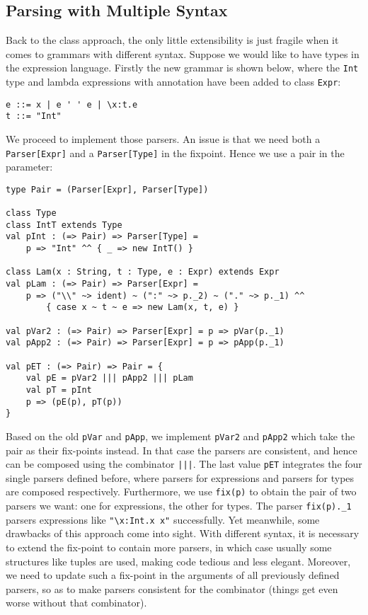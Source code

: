 \subsection{Parsing with Multiple Syntax}\label{subsec:differentsyntax}


Back to the class approach, the only little extensibility is just fragile when it comes to grammars with different syntax. Suppose we would like to have types in the expression language. Firstly the new grammar is shown below, where the \lstinline{Int} type and lambda expressions with annotation have been added to class \lstinline{Expr}:
\begin{lstlisting}
e ::= x | e ' ' e | \x:t.e
t ::= "Int"
\end{lstlisting}

We proceed to implement those parsers. An issue is that we need both a \lstinline{Parser[Expr]} and a \lstinline{Parser[Type]} in the fixpoint.
Hence we use a pair in the parameter:
\begin{lstlisting}
type Pair = (Parser[Expr], Parser[Type])

class Type
class IntT extends Type
val pInt : (=> Pair) => Parser[Type] =
    p => "Int" ^^ { _ => new IntT() }

class Lam(x : String, t : Type, e : Expr) extends Expr
val pLam : (=> Pair) => Parser[Expr] =
    p => ("\\" ~> ident) ~ (":" ~> p._2) ~ ("." ~> p._1) ^^
        { case x ~ t ~ e => new Lam(x, t, e) }

val pVar2 : (=> Pair) => Parser[Expr] = p => pVar(p._1)
val pApp2 : (=> Pair) => Parser[Expr] = p => pApp(p._1)

val pET : (=> Pair) => Pair = {
    val pE = pVar2 ||| pApp2 ||| pLam
    val pT = pInt
    p => (pE(p), pT(p))
}
\end{lstlisting}
Based on the old \lstinline{pVar} and \lstinline{pApp}, we implement \lstinline{pVar2} and \lstinline{pApp2} which take the pair as their fix-points instead.
In that case the parsers are consistent, and hence can be composed using the combinator \lstinline{|||}.
The last value \lstinline{pET} integrates the four single parsers defined before, where parsers for expressions and parsers for types are composed respectively. Furthermore, we use \lstinline{fix(p)} to obtain the pair of two parsers we want: one for expressions, the other for types. The parser \lstinline{fix(p)._1} parsers expressions like \lstinline{"\x:Int.x x"} successfully. Yet meanwhile, some drawbacks of this approach come into sight. With different syntax, it
is necessary to extend the fix-point to contain more parsers, in which case usually some structures like tuples are used,
making code tedious and less elegant. Moreover, we need to update such a fix-point in the arguments of all previously defined parsers, so as to make parsers consistent for the combinator (things get even worse without that combinator).

